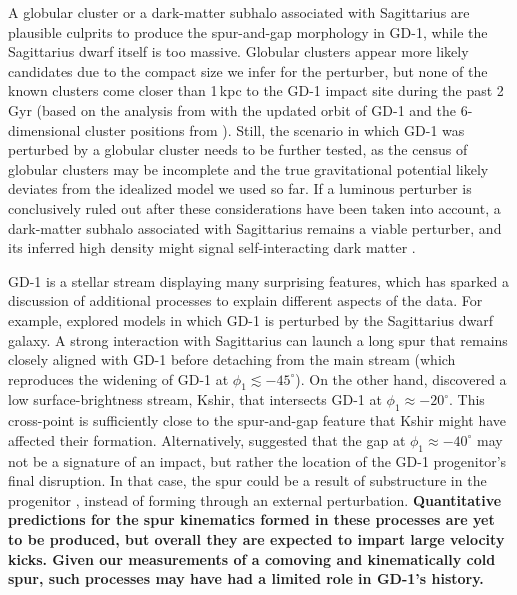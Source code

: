 \documentclass[twocolumn]{aastex63}
\newcommand{\changes}[1]{{\textbf{#1}}}
\begin{document}
A globular cluster or a dark-matter subhalo associated with Sagittarius are plausible culprits to produce the spur-and-gap morphology in GD-1, while the Sagittarius dwarf itself is too massive.
Globular clusters appear more likely candidates due to the compact size we infer for the perturber, but none of the known clusters come closer than 1\,kpc to the GD-1 impact site during the past 2\,Gyr (based on the analysis from \citealt{bonaca2019a} with the updated orbit of GD-1 and the 6-dimensional cluster positions from \citealt{baumgardt2019}).
Still, the scenario in which GD-1 was perturbed by a globular cluster needs to be further tested, as the census of globular clusters may be incomplete and the true gravitational potential likely deviates from the idealized model we used so far.
If a luminous perturber is conclusively ruled out after these considerations have been taken into account, a dark-matter subhalo associated with Sagittarius remains a viable perturber, and its inferred high density might signal self-interacting dark matter \citep[e.g.,][]{kahlhoefer2019}.

GD-1 is a stellar stream displaying many surprising features, which has sparked a discussion of additional processes to explain different aspects of the data.
For example, \citet{deboer2019} explored models in which GD-1 is perturbed by the Sagittarius dwarf galaxy.
A strong interaction with Sagittarius can launch a long spur that remains closely aligned with GD-1 before detaching from the main stream (which reproduces the widening of GD-1 at $\phi_1\lesssim-45^\circ$).
On the other hand, \citet{malhan2019c} discovered a low surface-brightness stream, Kshir, that intersects GD-1 at $\phi_1\approx-20^\circ$.
This cross-point is sufficiently close to the spur-and-gap feature that Kshir might have affected their formation.
Alternatively, \citet{webb2019} suggested that the gap at $\phi_1\approx-40^\circ$ may not be a signature of an impact, but rather the location of the GD-1 progenitor's final disruption.
In that case, the spur could be a result of substructure in the progenitor \citep[e.g.,][]{carlberg2018}, instead of forming through an external perturbation.
\changes{Quantitative predictions for the spur kinematics formed in these processes are yet to be produced, but overall they are expected to impart large velocity kicks.
Given our measurements of a comoving and kinematically cold spur, such processes may have had a limited role in GD-1's history.}
\end{document}
